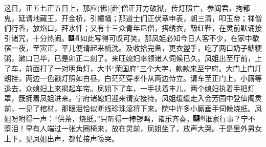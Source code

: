 这日，正五七正五日上，那应{{(佛)}}{[}赴{]}僧正开方破狱，传灯照亡，参阎君，拘都鬼，延请地藏王，开金桥，引幢幡；那道士们正伏章申表，朝三清，叩玉帝；禅僧们行香，放焰口，拜水忏；又有十三众青年尼僧，搭绣衣，靸红鞋，在灵前默诵接引诸咒，十分热闹。{\includegraphics[width=3mm]{../Images/00004}\includegraphics[width=3mm]{../Images/00010}\footnotesize \kaishu 如此写得可叹可笑。}那凤姐必知今日人客不少，在家中歇宿一夜，至寅正，平儿便请起来梳洗。及收拾完备，更衣盥手，吃了两口奶子糖粳粥，漱口已毕，已是卯正二刻了。来旺媳妇率领诸人伺候已久。凤姐出至厅前，上了车，前面打了一对明角灯，大书``荣国府''三个大字，款款来至宁府。大门上门灯朗挂，两边一色戳灯照如白昼，白茫茫穿孝仆从两边侍立。请车至正门上，小厮等退去，众媳妇上来揭起车帘。凤姐下了车，一手扶着丰儿，两个媳妇执着手把灯罩，簇拥着凤姐进来。宁府诸媳妇迎来请安接待。凤姐缓缓走入会芳园中登仙阁灵前，一见了棺材，那眼泪恰似断线珍珠滚将下来。院中许多小厮垂手伺候烧纸。凤姐吩咐得一声：``供茶，烧纸。''只听得一棒锣鸣，诸乐齐奏，{\includegraphics[width=3mm]{../Images/00004}\includegraphics[width=3mm]{../Images/00011}\footnotesize \kaishu 谁家行事？宁不堕泪！}早有人端过一张大圈椅来，放在灵前，凤姐坐了，放声大哭。于是里外男女上下，见凤姐出声，都忙接声嚎哭。

